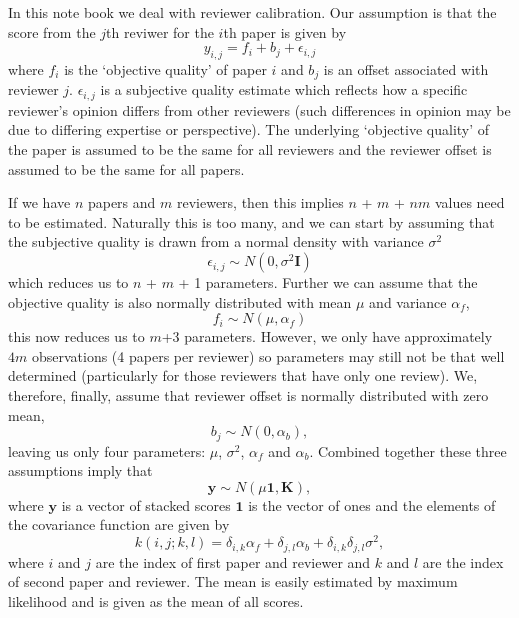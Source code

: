 \begin{flushright}
\end{flushright}

In this note book we deal with reviewer calibration. Our assumption is
that the score from the \(j\)th reviwer for the \(i\)th paper is given
by \[
y_{i,j} = f_i + b_j + \epsilon_{i, j}
\] where \(f_i\) is the `objective quality' of paper \(i\) and \(b_j\)
is an offset associated with reviewer \(j\). \(\epsilon_{i,j}\) is a
subjective quality estimate which reflects how a specific reviewer's
opinion differs from other reviewers (such differences in opinion may be
due to differing expertise or perspective). The underlying `objective
quality' of the paper is assumed to be the same for all reviewers and
the reviewer offset is assumed to be the same for all papers.

If we have \(n\) papers and \(m\) reviewers, then this implies \(n\) +
\(m\) + \(nm\) values need to be estimated. Naturally this is too many,
and we can start by assuming that the subjective quality is drawn from a
normal density with variance \(\sigma^2\) \[
\epsilon_{i, j} \sim N(0, \sigma^2 \mathbf{I})
\] which reduces us to \(n\) + \(m\) + 1 parameters. Further we can
assume that the objective quality is also normally distributed with mean
\(\mu\) and variance \(\alpha_f\), \[
f_i \sim N(\mu, \alpha_f)
\] this now reduces us to \(m\)+3 parameters. However, we only have
approximately \(4m\) observations (4 papers per reviewer) so parameters
may still not be that well determined (particularly for those reviewers
that have only one review). We, therefore, finally, assume that reviewer
offset is normally distributed with zero mean, \[
b_j \sim N(0, \alpha_b),
\] leaving us only four parameters: \(\mu\), \(\sigma^2\), \(\alpha_f\)
and \(\alpha_b\). Combined together these three assumptions imply that
\[
\mathbf{y} \sim N(\mu \mathbf{1}, \mathbf{K}),
\] where \(\mathbf{y}\) is a vector of stacked scores \(\mathbf{1}\) is
the vector of ones and the elements of the covariance function are given
by \[
k(i,j; k,l) = \delta_{i,k} \alpha_f + \delta_{j,l} \alpha_b + \delta_{i, k}\delta_{j,l} \sigma^2,
\] where \(i\) and \(j\) are the index of first paper and reviewer and
\(k\) and \(l\) are the index of second paper and reviewer. The mean is
easily estimated by maximum likelihood and is given as the mean of all
scores.

